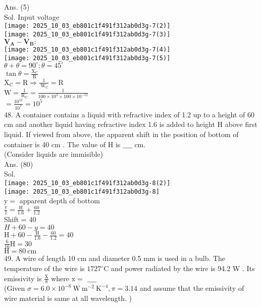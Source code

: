 \documentclass[10pt]{article}
\begin{document}
Ans. (5)\\
Sol. Input voltage\\
\texttt{[image: 2025\_10\_03\_eb801c1f491f312ab0d3g-7(2)]}\\
\texttt{[image: 2025\_10\_03\_eb801c1f491f312ab0d3g-7(3)]}\\
\(\mathbf{V}_{\mathbf{A}}-\mathbf{V}_{\mathbf{B}}:\)\\
\texttt{[image: 2025\_10\_03\_eb801c1f491f312ab0d3g-7(4)]}\\
\texttt{[image: 2025\_10\_03\_eb801c1f491f312ab0d3g-7(5)]}\\
\(\theta+\theta=90^{\circ} ; \theta=45^{\circ}\)\\
\(\tan \theta=\frac{\mathrm{X}_{\mathrm{C}}}{\mathrm{R}}\)\\
\(\mathrm{X}_{\mathrm{C}}=\mathrm{R} \Rightarrow \frac{1}{\mathrm{~W}_{\mathrm{C}}}=\mathrm{R}\)\\
\(\mathrm{W}=\frac{1}{\mathrm{R}_{\mathrm{C}}}=\frac{1}{100 \times 10^{3} \times 100 \times 10^{-12}}\)\\
\(=\frac{10^{12}}{10^{7}}=10^{5}\)\\
48. A container contains a liquid with refractive index of 1.2 up to a height of 60 cm and another liquid having refractive index 1.6 is added to height H above first liquid. If viewed from above, the apparent shift in the position of bottom of container is 40 cm . The value of H is \(\_\_\_\_\) cm.\\
(Consider liquids are immisible)\\
Ans. (80)\\
Sol.\\
\texttt{[image: 2025\_10\_03\_eb801c1f491f312ab0d3g-8(2)]}\\
\texttt{[image: 2025\_10\_03\_eb801c1f491f312ab0d3g-8]}\\
\(\mathrm{y}=\) apparent depth of bottom\\
\(\frac{\mathrm{y}}{1}=\frac{\mathrm{H}}{1.6}+\frac{60}{1.2}\)\\
Shift = 40\\
\(H+60-y=40\)\\
\(\mathrm{H}+60-\frac{\mathrm{H}}{1.6}-\frac{60}{1.2}=40\)\\
\(\frac{6}{16} \mathrm{H}=30\)\\
\(\mathrm{H}=80 \mathrm{~cm}\)\\
49. A wire of length 10 cm and diameter 0.5 mm is used in a bulb. The temperature of the wire is \(1727^{\circ} \mathrm{C}\) and power radiated by the wire is 94.2 W . Its emissivity is \(\frac{\mathrm{X}}{8}\) where \(\mathrm{x}=\) \(\_\_\_\_\)\\
(Given \(\sigma=6.0 \times 10^{-8} \mathrm{~W} \mathrm{~m}^{-2} \mathrm{~K}^{-4}, \pi=3.14\) and assume that the emissivity of wire material is same at all wavelength. )
\end{document}
